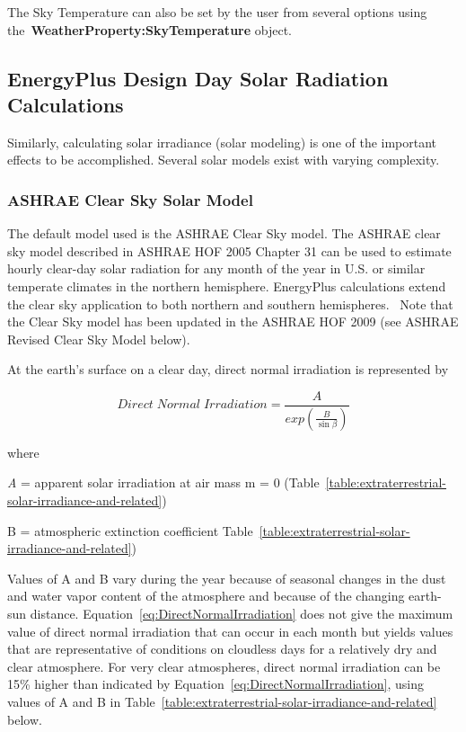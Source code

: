 The Sky Temperature can also be set by the user from several options using the~\textbf{WeatherProperty:SkyTemperature} object.

\subsection{EnergyPlus Design Day Solar Radiation Calculations}\label{energyplus-design-day-solar-radiation-calculations}

Similarly, calculating solar irradiance (solar modeling) is one of the important effects to be accomplished. Several solar models exist with varying complexity.

\subsubsection{ASHRAE Clear Sky Solar Model}\label{ashrae-clear-sky-solar-model}

The default model used is the ASHRAE Clear Sky model. The ASHRAE clear sky model described in ASHRAE HOF 2005 Chapter 31 can be used to estimate hourly clear-day solar radiation for any month of the year in U.S. or similar temperate climates in the northern hemisphere. EnergyPlus calculations extend the clear sky application to both northern and southern hemispheres.~ Note that the Clear Sky model has been updated in the ASHRAE HOF 2009 (see ASHRAE Revised Clear Sky Model below).

At the earth's surface on a clear day, direct normal irradiation is represented by

\begin{equation}
Direct\;Normal\;Irradiation = \frac{A}{exp\left( \frac{B}{\sin \beta } \right)}
\label{eq:DirectNormalIrradiation}
\end{equation}

where

\emph{A} = apparent solar irradiation at air mass m = 0 (Table~\ref{table:extraterrestrial-solar-irradiance-and-related})

B = atmospheric extinction coefficient Table~\ref{table:extraterrestrial-solar-irradiance-and-related})

Values of A and B vary during the year because of seasonal changes in the dust and water vapor content of the atmosphere and because of the changing earth-sun distance. Equation~\ref{eq:DirectNormalIrradiation} does not give the maximum value of direct normal irradiation that can occur in each month but yields values that are representative of conditions on cloudless days for a relatively dry and clear atmosphere. For very clear atmospheres, direct normal irradiation can be 15\% higher than indicated by Equation~\ref{eq:DirectNormalIrradiation}, using values of A and B in Table~\ref{table:extraterrestrial-solar-irradiance-and-related} below.

